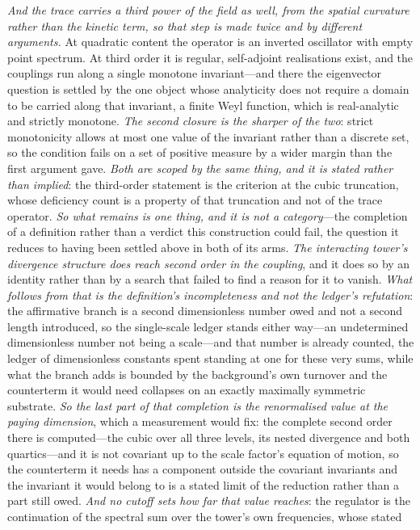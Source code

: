 \documentclass[11pt,a4paper]{article}
\theoremstyle{plain}
\theoremstyle{definition}
\theoremstyle{remark}
\begin{document}
\emph{And the trace carries a third power of the field as well, from the spatial curvature rather than the
kinetic term, so that step is made twice and by different arguments.} At quadratic content the operator is an
inverted oscillator with empty point spectrum. At third order it is regular, self-adjoint realisations exist,
and the couplings run along a single monotone invariant---and there the eigenvector question is settled by the
one object whose analyticity does not require a domain to be carried along that invariant, a finite Weyl
function, which is real-analytic and strictly monotone. \emph{The second closure is the sharper of the two}:
strict monotonicity allows at most one value of the invariant rather than a discrete set, so the condition
fails on a set of positive measure by a wider margin than the first argument gave. \emph{Both are scoped by
the same thing, and it is stated rather than implied}: the third-order statement is the criterion at the cubic
truncation, whose deficiency count is a property of that truncation and not of the trace operator. \emph{So
what remains is one thing, and it is not a category}---the completion of a definition
rather than a verdict this construction could fail, the question it reduces to having been settled above
in both of its arms. \emph{The interacting tower's divergence structure does reach second order in the
coupling}, and it does so by an identity rather than by a search that failed to find a reason for it to
vanish. \emph{What follows from that is the definition's incompleteness and not the ledger's refutation}:
the affirmative branch is a second dimensionless number owed and not a second length introduced, so the
single-scale ledger stands either way---an undetermined dimensionless number not being a scale---and that
number is already counted, the ledger of dimensionless constants spent standing at one for these very
sums, while what the branch adds is bounded by the background's own turnover and the counterterm it would
need collapses on an exactly maximally symmetric substrate. \emph{So the last part of that completion is the renormalised value
at the paying dimension}, which a measurement would fix: the complete second order there is computed---the cubic
over all three levels, its nested divergence and both quartics---and it is not covariant up to the scale
factor's equation of motion, so the counterterm it needs has a component outside the covariant invariants and the
invariant it would belong to is a stated limit of the reduction rather than a part still owed. \emph{And no cutoff sets how far that
value reaches}: the regulator is the continuation of the spectral sum over the tower's own frequencies, whose stated
\end{document}
